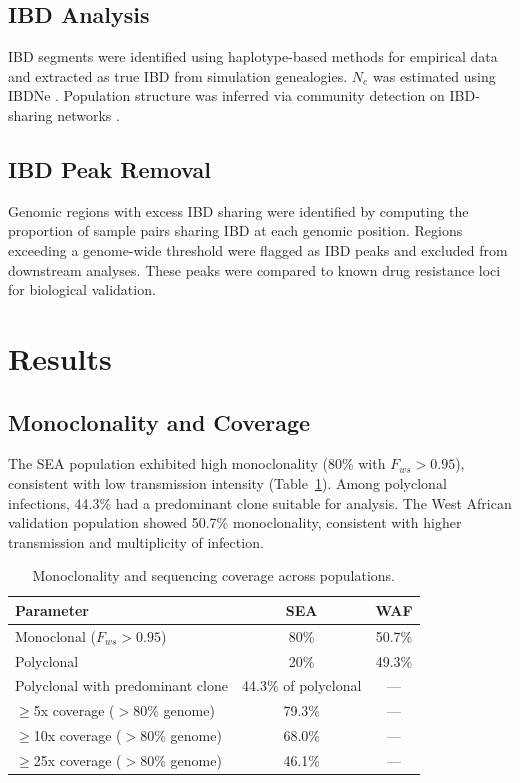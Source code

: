 \documentclass[11pt]{article}
\begin{document}
\subsection{IBD Analysis}

IBD segments were identified using haplotype-based methods for empirical data and extracted as true IBD from simulation genealogies. $N_e$ was estimated using IBDNe \citep{browning2018ibdne}. Population structure was inferred via community detection on IBD-sharing networks \citep{taylor2019identity}.

\subsection{IBD Peak Removal}

Genomic regions with excess IBD sharing were identified by computing the proportion of sample pairs sharing IBD at each genomic position. Regions exceeding a genome-wide threshold were flagged as IBD peaks and excluded from downstream analyses. These peaks were compared to known drug resistance loci for biological validation.

\section{Results}

\subsection{Monoclonality and Coverage}

The SEA population exhibited high monoclonality (80\% with $F_{ws} > 0.95$), consistent with low transmission intensity (Table~\ref{tab:monoclonal}). Among polyclonal infections, 44.3\% had a predominant clone suitable for analysis. The West African validation population showed 50.7\% monoclonality, consistent with higher transmission and multiplicity of infection.

\begin{table}[htbp]
\centering
\caption{Monoclonality and sequencing coverage across populations.}
\label{tab:monoclonal}
\begin{tabular}{lcc}
\toprule
\textbf{Parameter} & \textbf{SEA} & \textbf{WAF} \\
\midrule
Monoclonal ($F_{ws} > 0.95$) & 80\% & 50.7\% \\
Polyclonal & 20\% & 49.3\% \\
Polyclonal with predominant clone & 44.3\% of polyclonal & --- \\
$\geq$5x coverage ($>$80\% genome) & 79.3\% & --- \\
$\geq$10x coverage ($>$80\% genome) & 68.0\% & --- \\
$\geq$25x coverage ($>$80\% genome) & 46.1\% & --- \\
\bottomrule
\end{tabular}
\end{table}
\end{document}
